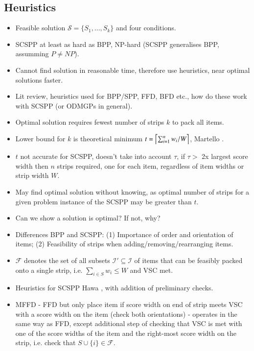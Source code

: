 \documentclass{elsarticle}
\begin{document}
\subsection{Heuristics}
\label{sub:heuristics}

{\color{Rhodamine}
\begin{itemize}
	\item Feasible solution $\mathcal{S} = \{S_1,...,S_k\}$ and four conditions.
	\item SCSPP at least as hard as BPP, NP-hard (SCSPP generalises BPP, assumming $P \neq NP$).
	\item Cannot find solution in reasonable time, therefore use heuristics, near optimal solutions faster.
	\item Lit review, heuristics used for BPP/SPP, FFD, BFD etc., how do these work with SCSPP (or ODMGPs in general).
	\item Optimal solution requires fewest number of strips $k$ to pack all items.
	\item Lower bound for $k$ is theoretical minimum $t = \ceil*{\sum_{i=1}^{n}w_i / W}$, Martello \cite{martello1990l}.
	\item $t$ not accurate for SCSPP, doesn't take into account $\tau$, if $\tau >$ 2x largest score width then $n$ strips required, one for each item, regardless of item widths or strip width $W$.
	\item May find optimal solution without knowing, as optimal number of strips for a given problem instance of the SCSPP may be greater than $t$.
	\item Can we show a solution is optimal? If not, why?
	\item Differences BPP and SCSPP: (1) Importance of order and orientation of items; (2) Feasibility of strips when adding/removing/rearranging items.
	\item $\mathcal{F}$ denotes the set of all subsets $\mathcal{I}' \subseteq \mathcal{I}$ of items that can be feasibly packed onto a single strip, i.e. $\sum_{i \in S} w_i \leq W$ and VSC met.
	\item Heuristics for SCSPP Hawa \cite{hawa2018}, with addition of preliminary checks.
	\item MFFD - FFD but only place item if score width on end of strip meets VSC with a score width on the item (check both orientations) - operates in the same way as FFD, except additional step of checking that VSC is met with one of the score widths of the item and the right-most score width on the strip, i.e. check that $S \cup \{i\} \in \mathcal{F}$.

\end{itemize}}
\end{document}
